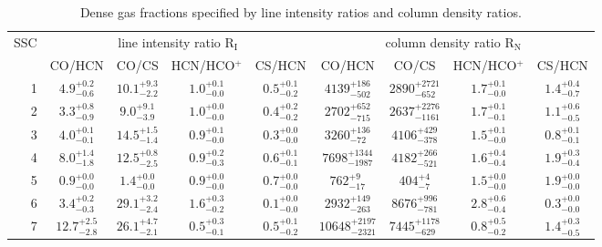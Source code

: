 
\begin{table}[ph]
    \centering
    \footnotesize
    \begin{threeparttable}
        \caption[Dense gas fractions]{Dense gas fractions specified by line intensity ratios and column density ratios.
        \label{SSCs: table: ratios dense gas}}
        
        \begin{tabular}{r|cccc|cccc}
            \toprule
            SSC & \multicolumn{4}{c}{line intensity ratio R$_\mathrm{I}$} & \multicolumn{4}{c}{column density ratio R$_\mathrm{N}$}\\
             & CO/HCN & CO/CS & HCN/HCO$^+$ & CS/HCN & CO/HCN & CO/CS & HCN/HCO$^+$ & CS/HCN \\
            \midrule
1 & $ 4.9^{+ 0.2}_{- 0.6}$ & $10.1^{+ 9.3}_{- 2.2}$ & $ 1.0^{+ 0.1}_{- 0.0}$ & $ 0.5^{+ 0.1}_{- 0.2}$ & $ 4139^{+  186}_{-  502}$ & $ 2890^{+ 2721}_{-  652}$ & $  1.7^{+  0.1}_{-  0.0}$ & $  1.4^{+  0.4}_{-  0.7}$\\
2 & $ 3.3^{+ 0.8}_{- 0.9}$ & $ 9.0^{+ 9.1}_{- 3.9}$ & $ 1.0^{+ 0.0}_{- 0.0}$ & $ 0.4^{+ 0.2}_{- 0.2}$ & $ 2702^{+  652}_{-  715}$ & $ 2637^{+ 2276}_{- 1161}$ & $  1.7^{+  0.1}_{-  0.1}$ & $  1.1^{+  0.6}_{-  0.5}$\\
3 & $ 4.0^{+ 0.1}_{- 0.1}$ & $14.5^{+ 1.5}_{- 1.4}$ & $ 0.9^{+ 0.1}_{- 0.0}$ & $ 0.3^{+ 0.0}_{- 0.0}$ & $ 3260^{+  136}_{-   72}$ & $ 4106^{+  429}_{-  378}$ & $  1.5^{+  0.1}_{-  0.0}$ & $  0.8^{+  0.1}_{-  0.1}$\\
4 & $ 8.0^{+ 1.4}_{- 1.8}$ & $12.5^{+ 0.8}_{- 2.5}$ & $ 0.9^{+ 0.2}_{- 0.3}$ & $ 0.6^{+ 0.1}_{- 0.1}$ & $ 7698^{+ 1344}_{- 1987}$ & $ 4182^{+  266}_{-  521}$ & $  1.6^{+  0.4}_{-  0.4}$ & $  1.9^{+  0.3}_{-  0.4}$\\
5 & $ 0.9^{+ 0.0}_{- 0.0}$ & $ 1.4^{+ 0.0}_{- 0.0}$ & $ 0.9^{+ 0.0}_{- 0.0}$ & $ 0.7^{+ 0.0}_{- 0.0}$ & $  762^{+    9}_{-   17}$ & $  404^{+    4}_{-    7}$ & $  1.5^{+  0.0}_{-  0.0}$ & $  1.9^{+  0.0}_{-  0.0}$\\
6 & $ 3.4^{+ 0.2}_{- 0.3}$ & $29.1^{+ 3.2}_{- 2.4}$ & $ 1.6^{+ 0.3}_{- 0.2}$ & $ 0.1^{+ 0.0}_{- 0.0}$ & $ 2932^{+  149}_{-  263}$ & $ 8676^{+  996}_{-  781}$ & $  2.8^{+  0.6}_{-  0.4}$ & $  0.3^{+  0.0}_{-  0.0}$\\
7 & $12.7^{+ 2.5}_{- 2.8}$ & $26.1^{+ 4.7}_{- 2.1}$ & $ 0.5^{+ 0.3}_{- 0.1}$ & $ 0.5^{+ 0.1}_{- 0.2}$ & $10648^{+ 2197}_{- 2321}$ & $ 7445^{+ 1178}_{-  629}$ & $  0.8^{+  0.5}_{-  0.2}$ & $  1.4^{+  0.3}_{-  0.5}$\\

\end{tabular}
\end{threeparttable}
\end{table}
